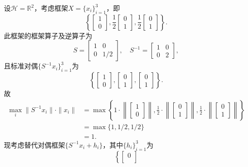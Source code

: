 \documentclass[cn,11pt,a4paper,founder]{elegantpaper}
\newcommand{\calH}{\mathcal{H}}
\newcommand{\bbR}{\mathbb{R}}
\begin{document}
\begin{example}[具有无穷个最佳对偶框架的例子]
设\(\calH=\bbR^2\)，考虑框架\(X=\{x_i\}_{i=1}^3\)，即
\[
	\left\{\begin{bmatrix}
	1\\
	0
	\end{bmatrix},
	\frac{1}{2}\begin{bmatrix}
	0\\
	1
	\end{bmatrix},
	\frac{1}{2}\begin{bmatrix}
	0\\
	1
	\end{bmatrix}\right\}.
\]
此框架的框架算子及逆算子为
\[
	S=\begin{bmatrix}
	1&0\\
	0&1/2
	\end{bmatrix},
	\quad
	S^{-1}=\begin{bmatrix}
	1&0\\
	0&2
	\end{bmatrix},
\]
且标准对偶\(\{S^{-1}x_i\}_{i=1}^3\)为
\[
	\left\{\begin{bmatrix}
	1\\
	0
	\end{bmatrix},
	\begin{bmatrix}
	0\\
	1
	\end{bmatrix},
	\begin{bmatrix}
	0\\
	1
	\end{bmatrix}\right\}.
\]
故
\begin{align*}
\max_i\|S^{-1}x_i\|\cdot\|x_i\|&=\max\left\{
	1\cdot\left\|\begin{bmatrix}
	1\\
	0
	\end{bmatrix}\right\|,
	\frac{1}{2}\cdot\left\|\begin{bmatrix}
	0\\
	1
	\end{bmatrix}\right\|,
	\frac{1}{2}\cdot\left\|\begin{bmatrix}
	0\\
	1
	\end{bmatrix}\right\|\right\}\\
	&=\max\big\{1,1/2,1/2\big\}\\
	&=1.
\end{align*}
现考虑替代对偶框架\(\{S^{-1}x_i+h_i\}\)，其中\(\{h_i\}_{i=1}^3\)为
\[
	\left\{\begin{bmatrix}
	0\\

\end{bmatrix}\]
\end{example}
\end{document}
